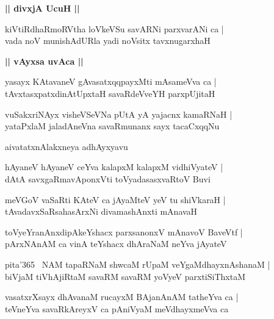 \documentclass[twoside,12pt,openright]{book}
\newcounter{shloka}[chapter]
\def\uvaca#1{\centerline{{\large\textbf{#1}}}}
\begin{document}
\uvaca{|| divxjA UcuH ||}

\begin{shloka}%
kiVtiRdhaRmoRVtha loVkeVSu savARNi parxvarANi ca |\\
vada noV munishAdURla yadi noVsitx tavxnugarxhaH 
\end{shloka}

\uvaca{|| vAyxsa uvAca ||}

\begin{shloka}%
yasayx KAtavaneV gAvasatxqqpayxMti mAsameVva ca |\\
tAvxtasxpatxdinAtUpxtaH savaRdeVveYH parxpUjitaH 
\end{shloka}

\begin{shloka}%
vuSakxriNAyx visheVSeVNa pUtA yA yajacnx kamaRNaH |\\
yataPxlaM jaladAneVna savaRmunanx sayx tacaCxqqNu
\end{shloka}

\begin{center}
aivatatxnAlakxneya adhAyxyavu
\end{center}

\begin{shloka}%
hAyaneV hAyaneV ceYva kalapxM kalapxM vidhiVyateV |\\
dAtA savxgaRmavAponxVti toVyadasasxvaRtoV Buvi 
\end{shloka}

\begin{shloka}%
meVGoV vaSaRti KAteV ca jAyaMteV yeV tu shiVkaraH |\\
tAvadavxSaRsahasArxNi divamashAnxti mAnavaH 
\end{shloka}

\begin{shloka}%
toVyeYranAnxdipAkeYshacx parxsanonxV mAnavoV BaveVtf |\\
pArxNAnAM  ca vinA teYshacx dhAraNaM neYva jAyateV 
\end{shloka}

\begin{shloka}%
pita\char'365 ~NAM tapaRNaM shwcaM rUpaM veYgaMdhayxnAshanaM |\\
biVjaM tiVhAjiRtaM savaRM savaRM yoVyeV parxtiSiThxtaM 
\end{shloka}

\begin{shloka}%
vasatxrXsayx dhAvanaM rucayxM BAjanAnAM tatheYva ca |\\
teVneYva savaRkAreyxV ca pAniVyaM meVdhayxmeVva ca 
\end{shloka}
\end{document}
